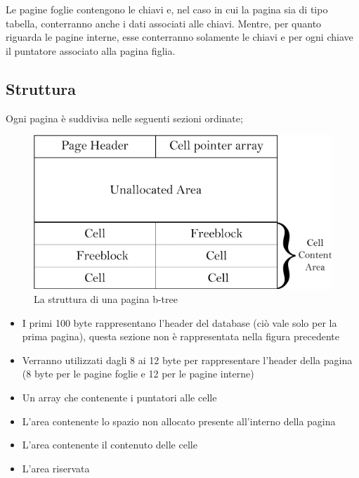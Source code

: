 Le pagine foglie contengono le chiavi e, nel caso in cui la pagina sia di tipo tabella, conterranno anche i dati associati alle chiavi. Mentre, per quanto riguarda le pagine interne, esse conterranno solamente le chiavi e per ogni chiave il puntatore associato alla pagina figlia.

\newpage
	
\subsection{Struttura}

Ogni pagina è suddivisa nelle seguenti sezioni ordinate;

\begin{figure}[ht]
	\centerline{\includegraphics[scale=0.25, ]{assets/b-tree-page-structure}}
	\caption{La struttura di una pagina b-tree}
	\label{fig:btreepagestructure}
	
\end{figure}

\begin{itemize}
\item I primi 100 byte rappresentano l’header del database (ciò vale solo per la prima pagina), questa sezione non è rappresentata nella figura precedente
\item Verranno utilizzati dagli 8 ai 12 byte per rappresentare l’header della pagina
(8 byte per le pagine foglie e 12 per le pagine interne)
\item Un array che contenente i puntatori alle celle
\item L’area contenente lo spazio non allocato presente all’interno della pagina
\item L’area contenente il contenuto delle celle
\item L’area riservata
\end{itemize}

